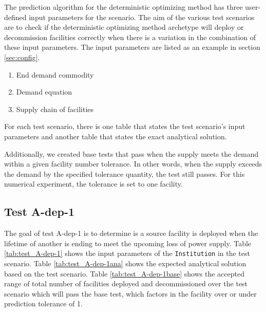 \documentclass[11pt,letterpaper]{article}
\begin{document}
The prediction algorithm for the deterministic optimizing method has three user-defined input parameters for the scenario.
The aim of the various test scenarios are to check if the
deterministic optimizing method archetype will deploy or decommission facilities correctly when there is a variation
in the combination of these input parameters. The input parameters are listed as an example in section \ref{sec:config}.

\begin{enumerate}
	\item End demand commodity
	\item Demand equation 
	\item Supply chain of facilities
\end{enumerate}

For each test scenario, there is one table that states the test scenario's input parameters and another table that states the exact analytical solution. 

Additionally, we created base tests that pass when the supply meets the demand within a given facility number tolerance.
In other words, when the supply exceeds the demand by the specified tolerance quantity, the test still passes. For this numerical experiment, the tolerance is set to one facility. 

\subsection{Test A-dep-1}
The goal of test A-dep-1 is to determine is a source facility is deployed when the lifetime of another is ending to meet the upcoming loss of power supply. 
Table \ref{tab:test_A-dep-1} shows the input parameters of the \texttt{Institution} in the test scenario. Table \ref{tab:test_A-dep-1ana} shows the expected analytical solution based on the test scenario. Table \ref{tab:test_A-dep-1base} shows the accepted range of total number of facilities deployed and decommissioned over the test scenario which will pass the base test, which factors in the facility over or under prediction tolerance of 1.
\end{document}
